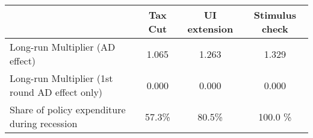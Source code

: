 \begin{tabular}{@{}lccc@{}} 
\toprule 
& Tax Cut    & UI extension    & Stimulus check    \\  \midrule 
Long-run Multiplier (AD effect) &1.065  & 1.263  & 1.329     \\ 
Long-run Multiplier (1st round AD effect only) &0.000  & 0.000  & 0.000     \\ 
Share of policy expenditure during recession &57.3\%  & 80.5\%  & 100.0 \%    \\ 
\end{tabular}  
